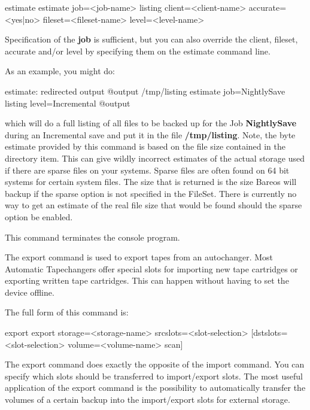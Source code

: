 \begin{description}
\begin{bconsole}{estimate}
estimate job=<job-name> listing client=<client-name> accurate=<yes|no> fileset=<fileset-name> level=<level-name>
\end{bconsole}

   Specification of the {\bf job} is sufficient, but you can also override the
   client, fileset, accurate and/or level by specifying them on the estimate
   command line.

As an example, you might do:

\begin{bconsole}{estimate: redirected output}
@output /tmp/listing
estimate job=NightlySave listing level=Incremental
@output
\end{bconsole}

   which will do a full listing of all files to be backed up for the  Job {\bf
   NightlySave} during an Incremental save and put it in the  file {\bf
   /tmp/listing}.  Note, the byte estimate provided by this command is
   based on the file size contained in the directory item. This can give
   wildly incorrect estimates of the actual storage used if there are
   sparse files on your systems. Sparse files are often found on 64 bit
   systems for certain system files. The size that is returned is the size
   Bareos will backup if the sparse option is not specified in the FileSet.
   There is currently no way to get an estimate of the real file size that
   would be found should the sparse option be enabled.

\item [exit]
   This command terminates the console program.

\item [export]
   The export command is used to export tapes from an autochanger. Most Automatic
   Tapechangers offer special slots for importing new tape cartridges or
   exporting written tape cartridges. This can happen without having to set
   the device offline.

   The full form of this command is:

\begin{bconsole}{export}
export storage=<storage-name> srcslots=<slot-selection> [dstslots=<slot-selection> volume=<volume-name> scan]
\end{bconsole}

   The export command does exactly the opposite of the import command. You
   can specify which slots should be transferred to import/export slots. The
   most useful application of the export command is the possibility to
   automatically transfer the volumes of a certain backup into the import/export
   slots for external storage.


\end{description}
